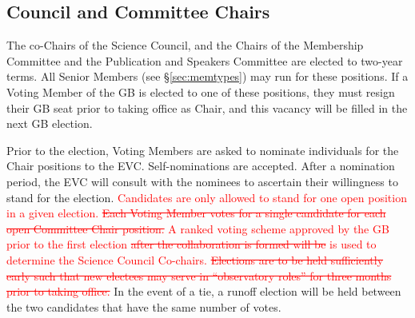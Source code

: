 \documentclass[12pt]{article}
\begin{document}


\subsection{Council and Committee Chairs}
The co-Chairs of the Science Council, and the Chairs of the Membership Committee and the Publication and Speakers Committee are elected to two-year terms. All Senior Members (see \S\ref{sec:memtypes}) may  run for these positions.  If a Voting Member of the GB is elected to one of these positions, they must resign their GB seat prior to taking office as Chair, and this vacancy will be filled in the next GB election. 

Prior to the election, Voting Members are asked to nominate individuals for the Chair positions to the EVC.   Self-nominations are accepted.
After a nomination period, the EVC will consult with the nominees to ascertain their willingness to stand for the election. \textcolor{red}{Candidates are only allowed to stand for one open position in a given election.
\sout{Each Voting Member votes for a single candidate for each  open Committee  Chair position.} A ranked voting scheme approved by the GB prior to the first election \sout{after the collaboration is formed will be} is used to determine the Science Council Co-chairs. \sout{Elections are to be held sufficiently early such that new electees may serve in ``observatory roles'' for three months prior to taking office.}}
In the event of a tie, a runoff election will be held between the two candidates that have the same number of votes. 
\end{document}
